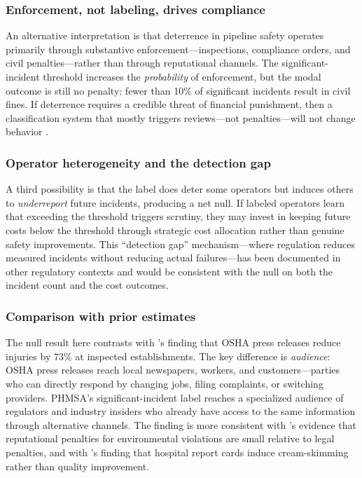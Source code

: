 \documentclass[12pt]{article}
\begin{document}
\subsubsection*{Enforcement, not labeling, drives compliance} An alternative interpretation is that deterrence in pipeline safety operates primarily through substantive enforcement---inspections, compliance orders, and civil penalties---rather than through reputational channels. The significant-incident threshold increases the \textit{probability} of enforcement, but the modal outcome is still no penalty: fewer than 10\% of significant incidents result in civil fines. If deterrence requires a credible threat of financial punishment, then a classification system that mostly triggers reviews---not penalties---will not change behavior \citep{shimshack2007enforce}.

\subsubsection*{Operator heterogeneity and the detection gap} A third possibility is that the label does deter some operators but induces others to \textit{underreport} future incidents, producing a net null. If labeled operators learn that exceeding the threshold triggers scrutiny, they may invest in keeping future costs below the threshold through strategic cost allocation rather than genuine safety improvements. This ``detection gap'' mechanism---where regulation reduces measured incidents without reducing actual failures---has been documented in other regulatory contexts \citep{gunningham2007mine, short2013dilemmas} and would be consistent with the null on both the incident count and the cost outcomes.

\subsubsection*{Comparison with prior estimates} The null result here contrasts with \citet{johnson2020regulation}'s finding that OSHA press releases reduce injuries by 73\% at inspected establishments. The key difference is \textit{audience}: OSHA press releases reach local newspapers, workers, and customers---parties who can directly respond by changing jobs, filing complaints, or switching providers. PHMSA's significant-incident label reaches a specialized audience of regulators and industry insiders who already have access to the same information through alternative channels. The finding is more consistent with \citet{karpoff2005reputational}'s evidence that reputational penalties for environmental violations are small relative to legal penalties, and with \citet{dranove2003more}'s finding that hospital report cards induce cream-skimming rather than quality improvement.
\end{document}
